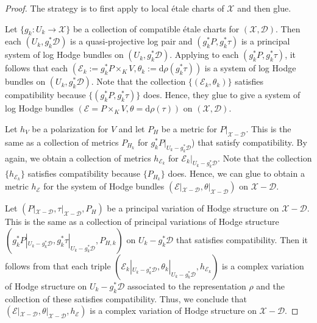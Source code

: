 \documentclass[a4paper]{amsart}
\theoremstyle{definition}
\begin{document}
\begin{proof}
The strategy is to first apply \cite[Lemma 3.10]{dengcadorel} to local \'etale charts of $\mathscr{X}$ and then glue.

Let $\{g_k:U_k\to \mathscr{X}\}$ be a collection of compatible \'etale charts for $(\mathscr{X},\mathscr{D})$. Then each $(U_k,g_k^*\mathscr{D})$ is a quasi-projective log pair and $(g_k^*P,g_k^*\tau)$ is a principal system of log Hodge bundles on $(U_k,g_k^*\mathscr{D})$. Applying \cite[Lemma 3.10]{dengcadorel} to each $(g_k^*P,g_k^*\tau)$, it follows that each $(\mathcal{E}_k:=g_k^*P\times_KV,\theta_k:=\mathrm{d}\rho(g_k^*\tau))$ is a system of log Hodge bundles on $(U_k,g_k^*\mathscr{D})$. Note that the collection $\{(\mathcal{E}_k,\theta_k)\}$ satisfies compatibility because $\{(g_k^*P,g_k^*\tau)\}$ does. Hence, they glue to give a system of log Hodge bundles $(\mathcal{E}=P\times_KV,\theta=\mathrm{d}\rho(\tau))$ on $(\mathscr{X},\mathscr{D})$.

Let $h_V$ be a polarization for $V$ and let $P_H$ be a metric for $P|_{\mathscr{X}-\mathscr{D}}$. This is the same as a collection of metrics $P_{H_k}$ for $g_k^*P|_{U_k-g_k^*\mathscr{D}}$) that satisfy compatibility. By \cite[Lemma 3.10]{dengcadorel} again, we obtain a collection of metrics $h_{\mathcal{E}_k}$ for $\mathcal{E}_k|_{U_k-g_k^*\mathscr{D}}$. Note that the collection $\{h_{\mathcal{E}_k}\}$ satisfies compatibility because $\{P_{H_k}\}$ does. Hence, we can glue to obtain a metric $h_{\mathcal{E}}$ for the system of Hodge bundles $(\mathcal{E}|_{\mathscr{X}-\mathscr{D}},\theta|_{\mathscr{X}-\mathscr{D}})$ on $\mathscr{X}-\mathscr{D}$.

Let $(P|_{\mathscr{X}-\mathscr{D}},\tau|_{\mathscr{X}-\mathscr{D}},P_H)$ be a principal variation of Hodge structure on $\mathscr{X}-\mathscr{D}$. This is the same as a collection of principal variations of Hodge structure $(g_k^*P|_{U_k-g_k^*\mathscr{D}},g_k^*\tau|_{U_k-g_k^*\mathscr{D}},P_{H,k})$ on $U_k-g_k^*\mathscr{D}$ that satisfies compatibility. Then it follows from \cite[Lemma 3.10]{dengcadorel} that each triple $(\mathcal{E}_k|_{U_k-g_k^*\mathscr{D}},\theta_k|_{U_k-g_k^*\mathscr{D}},h_{\mathcal{E}_k})$ is a complex variation of Hodge structure on $U_k-g_k^*\mathscr{D}$ associated to the representation $\rho$ and the collection of these satisfies compatibility. Thus, we conclude that $(\mathcal{E}|_{\mathscr{X}-\mathscr{D}},\theta|_{\mathscr{X}-\mathscr{D}},h_{\mathcal{E}})$ is a complex variation of Hodge structure on $\mathscr{X}-\mathscr{D}$.
\end{proof}
\end{document}
